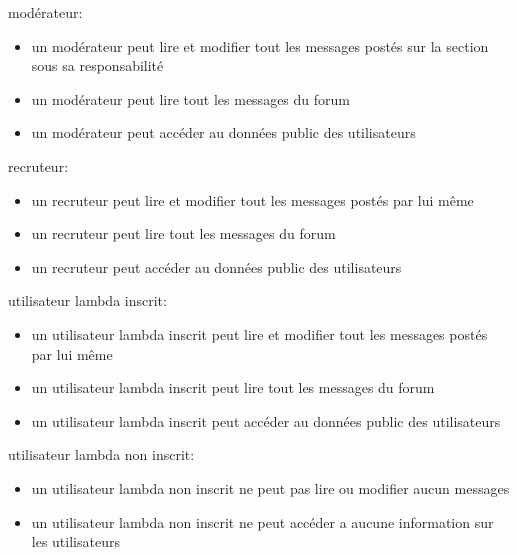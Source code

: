 \documentclass{report}
\begin{document}
modérateur:
\begin{itemize}
	\item un modérateur peut lire et modifier tout les messages postés sur la section sous sa responsabilité
  \item un modérateur peut lire tout les messages du forum
	\item un modérateur peut accéder au données public des utilisateurs\\
\end{itemize}


recruteur:
\begin{itemize}
  \item un recruteur peut lire et modifier tout les messages postés par lui même
  \item un recruteur peut lire tout les messages du forum
  \item un recruteur peut accéder au données public des utilisateurs\\
\end{itemize}



utilisateur lambda inscrit:
\begin{itemize}
  \item un utilisateur lambda inscrit peut lire et modifier tout les messages postés par lui même
  \item un utilisateur lambda inscrit peut lire tout les messages du forum
  \item un utilisateur lambda inscrit peut accéder au données public des utilisateurs\\
\end{itemize}


utilisateur lambda non inscrit:
\begin{itemize}
  \item un utilisateur lambda non inscrit ne peut pas lire ou modifier aucun messages
  \item un utilisateur lambda non inscrit ne peut accéder a aucune information sur les utilisateurs\\
\end{itemize}
\end{document}

